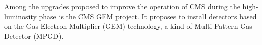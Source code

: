 Among the upgrades proposed to improve the operation of CMS during the high-luminosity phase is the CMS GEM project. It proposes to install detectors based on the Gas Electron Multiplier (GEM) technology, a kind of Multi-Pattern Gas Detector (MPGD).
